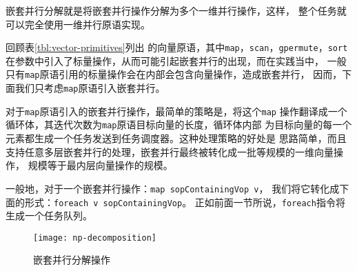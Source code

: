 嵌套并行分解就是将嵌套并行操作分解为多个一维并行操作，这样，
整个任务就可以完全使用一维并行原语实现。

回顾表\ref{tbl:vector-primitives}列出
的向量原语，其中\texttt{map}，\texttt{scan}，\texttt{gpermute}，\texttt{sort}
在参数中引入了标量操作，从而可能引起嵌套并行的出现，而在实践当中，
一般只有\texttt{map}原语引用的标量操作会在内部会包含向量操作，造成嵌套并行，
因而，下面我们只考虑\texttt{map}原语引入嵌套并行。

对于\texttt{map}原语引入的嵌套并行操作，最简单的策略是，将这个\texttt{map}
操作翻译成一个循环体，其迭代次数为\texttt{map}原语目标向量的长度，循环体内部
为目标向量的每一个元素都生成一个任务发送到任务调度器。这种处理策略的好处是
思路简单，而且支持任意多层嵌套并行的处理，嵌套并行最终被转化成一批等规模的一维向量操作，
规模等于最内层向量操作的规模。

一般地，对于一个嵌套并行操作：\texttt{map sopContainingVop v}，
我们将它转化成下面的形式：\texttt{foreach v sopContainingVop}。
正如前面一节所说，\texttt{foreach}指令将生成一个任务队列。


\begin{quotation}
\end{quotation}
\begin{figure}
  \centering
  \texttt{[image: np-decomposition]}
  \caption{嵌套并行分解操作}
  \label{fig:np-decomposition}
\end{figure}

